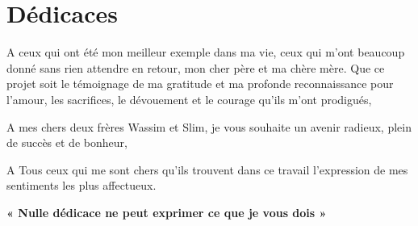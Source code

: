  
\chapter*{\Huge Dédicaces}


\begingroup
    \large \raggedright 
    \begin{center}

        


    A ceux qui ont été mon meilleur exemple dans ma vie, ceux qui m’ont beaucoup donné sans rien attendre en retour, mon cher père et ma chère mère. Que ce projet soit le témoignage de ma gratitude et ma profonde reconnaissance pour l’amour, les sacrifices, le dévouement et le courage qu’ils m’ont prodigués,



A mes chers deux frères Wassim et Slim, je vous souhaite un avenir radieux, plein de succès et de bonheur,




 A Tous ceux qui me sont chers qu’ils trouvent dans ce travail l’expression de mes sentiments les plus affectueux.



  \textbf{« Nulle dédicace ne peut exprimer ce que je vous dois »}
 



     \end{center}
\endgroup

\vspace{8mm}

\begin{flushright}
    \LARGE \@author
\end{flushright}